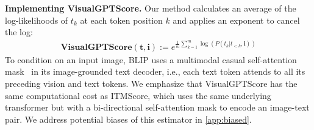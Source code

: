 \documentclass{article} \usepackage{iclr2024_conference,times}
\begin{document}
{\bf Implementing VisualGPTScore.} Our method calculates an average of the log-likelihoods of $t_k$ at each token position $k$ and applies an exponent to cancel the log:
\begin{align}
    \textbf{VisualGPTScore}(\mathbf{t}, \mathbf{i}) := e^{\frac{1}{m} \sum_{k=1}^m \log(P(t_k | t_{<k}, \mathbf{i}))}
\label{eq:visual_gpt_score}
\end{align}
To condition on an input image, BLIP uses a multimodal casual self-attention mask~\citep{blip} in its image-grounded text decoder, i.e., each text token attends to all its preceding vision and text tokens. We emphasize that VisualGPTScore has the same computational cost as ITMScore, which uses the same underlying transformer but with a bi-directional self-attention mask to encode an image-text pair. We address potential biases of this estimator in \autoref{app:biased}.
\end{document}
